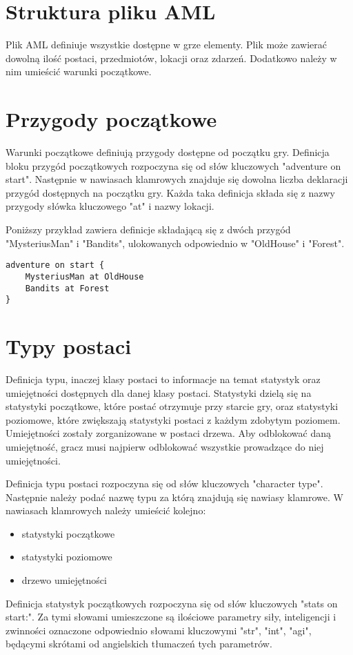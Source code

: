 \documentclass	{xmgr}
\begin{document}
\section{Struktura pliku AML} 
Plik AML definiuje wszystkie dostępne w grze elementy. Plik może zawierać dowolną ilość postaci, przedmiotów, lokacji oraz zdarzeń. Dodatkowo należy w nim umieścić warunki początkowe. 

\section{Przygody początkowe} 
Warunki początkowe definiują przygody dostępne od początku gry. Definicja bloku przygód początkowych rozpoczyna się od słów kluczowych
"adventure on start". Następnie w nawiasach klamrowych znajduje się dowolna liczba deklaracji przygód dostępnych na początku gry.
Każda taka definicja składa się z nazwy przygody słówka kluczowego "at" i nazwy lokacji.

Poniższy przykład zawiera definicje składającą się z dwóch przygód "MysteriusMan" i "Bandits", ulokowanych odpowiednio w "OldHouse" i "Forest".
\begin{lstlisting}
adventure on start {
	MysteriusMan at OldHouse
	Bandits at Forest
}
\end{lstlisting}
\section{Typy postaci}
Definicja typu, inaczej klasy postaci to informacje na temat statystyk oraz umiejętności dostępnych dla danej klasy postaci. Statystyki dzielą się na statystyki początkowe, które postać otrzymuje przy starcie gry, oraz statystyki poziomowe, które zwiększają statystyki postaci z każdym zdobytym poziomem. Umiejętności zostały zorganizowane w postaci drzewa. Aby odblokować daną umiejętność, gracz musi najpierw odblokować wszystkie prowadzące do niej umiejętności.

Definicja typu postaci rozpoczyna się od słów kluczowych "character type". Następnie należy podać nazwę typu za którą znajdują się nawiasy klamrowe. W nawiasach klamrowych należy umieścić kolejno:
\begin{itemize}
	\item statystyki początkowe
	\item statystyki poziomowe
	\item drzewo umiejętności
\end{itemize}

Definicja statystyk początkowych rozpoczyna się od słów kluczowych "stats on start:". Za tymi słowami umieszczone są ilościowe parametry siły, inteligencji i zwinności oznaczone odpowiednio słowami kluczowymi "str", "int", "agi", będącymi skrótami od angielskich tłumaczeń tych parametrów.
\end{document}
